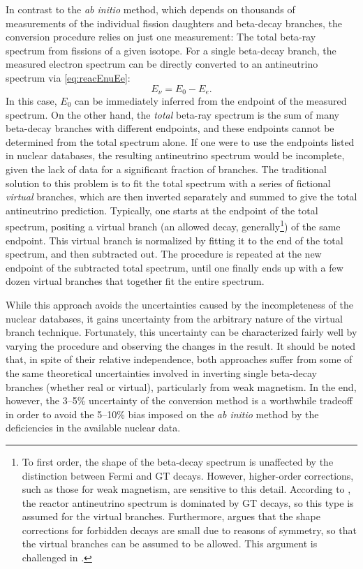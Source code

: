 \documentclass[../thesis.tex]{subfiles}
\begin{document}
In contrast to the \emph{ab initio} method, which depends on thousands of measurements of the individual fission daughters and beta-decay branches, the conversion procedure relies on just one measurement: The total beta-ray spectrum from fissions of a given isotope. For a single beta-decay branch, the measured electron spectrum can be directly converted to an antineutrino spectrum via \autoref{eq:reacEnuEe}:
\begin{equation*}
  E_\nu = E_0 - E_e.
\end{equation*}
In this case, $E_0$ can be immediately inferred from the endpoint of the measured spectrum. On the other hand, the \emph{total} beta-ray spectrum is the sum of many beta-decay branches with different endpoints, and these endpoints cannot be determined from the total spectrum alone. If one were to use the endpoints listed in nuclear databases, the resulting antineutrino spectrum would be incomplete, given the lack of data for a significant fraction of branches. The traditional solution to this problem is to fit the total spectrum with a series of fictional \emph{virtual} branches, which are then inverted separately and summed to give the total antineutrino prediction. Typically, one starts at the endpoint of the total spectrum, positing a virtual branch (an allowed decay, generally\footnote{To first order, the shape of the beta-decay spectrum is unaffected by the distinction between Fermi and GT decays. However, higher-order corrections, such as those for weak magnetism, are sensitive to this detail. According to \cite{PhysRevC.84.024617}, the reactor antineutrino spectrum is dominated by GT decays, so this type is assumed for the virtual branches. Furthermore, \cite{PhysRevC.84.024617} argues that the shape corrections for forbidden decays are small due to reasons of symmetry, so that the virtual branches can be assumed to be allowed. This argument is challenged in \cite{Hayes}.}) of the same endpoint. This virtual branch is normalized by fitting it to the end of the total spectrum, and then subtracted out. The procedure is repeated at the new endpoint of the subtracted total spectrum, until one finally ends up with a few dozen virtual branches that together fit the entire spectrum.

While this approach avoids the uncertainties caused by the incompleteness of the nuclear databases, it gains uncertainty from the arbitrary nature of the virtual branch technique. Fortunately, this uncertainty can be characterized fairly well by varying the procedure and observing the changes in the result. It should be noted that, in spite of their relative independence, both approaches suffer from some of the same theoretical uncertainties involved in inverting single beta-decay branches (whether real or virtual), particularly from weak magnetism. In the end, however, the 3--5\% uncertainty of the conversion method is a worthwhile tradeoff in order to avoid the 5--10\% bias imposed on the \emph{ab initio} method by the deficiencies in the available nuclear data.
\end{document}
